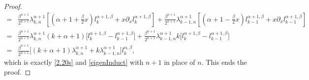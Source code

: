 \documentclass[10pt,reqno]{amsart}
\theoremstyle{remark}
\theoremstyle{definition}
\begin{document}
\begin{proof}
\begin{align*}
=&\frac{\beta^{n+1}}{2^{n+1}}  \lambda^{\alpha+1}_{k,n} \left[ (\alpha+1+ \tfrac{\beta}{2} x ) l^{\alpha+1,\beta}_{k}
+ x \partial_x l^{\alpha+1,\beta}_{k}\right]
+ \frac{\beta^{n+1}}{2^{n+1}} \lambda^{\alpha+1}_{k-1,n} \left[ ( \alpha+1-\tfrac{\beta}{2} x ) l^{\alpha+1,\beta}_{k-1}
+ x \partial_x l^{\alpha+1,\beta}_{k-1}\right]
\\
=& \frac{\beta^{n+1}}{2^{n+1}}  \lambda^{\alpha+1}_{k,n} (k+\alpha+1)  \big[ l^{\alpha+1,\beta}_{k}-  l^{\alpha+1,\beta}_{k-1}\big]
+ \frac{\beta^{n+1}}{2^{n+1}}  \lambda^{\alpha+1}_{k-1,n} k  \big[ l^{\alpha+1,\beta}_{k}-  l^{\alpha+1,\beta}_{k-1}\big]
\\
=&\frac{\beta^{n+1}}{2^{n+1}}  \big[ (k+\alpha+1)  \lambda^{\alpha+1}_{k,n} +  k\lambda^{\alpha+1}_{k-1,n}\big]   l^{\alpha,\beta}_{k},
\end{align*}
which is exactly  \eqref{2.20s} and \eqref{eigenInduct} with $n+1$ in place of $n$.
This ends the proof.
\end{proof}
\end{document}

